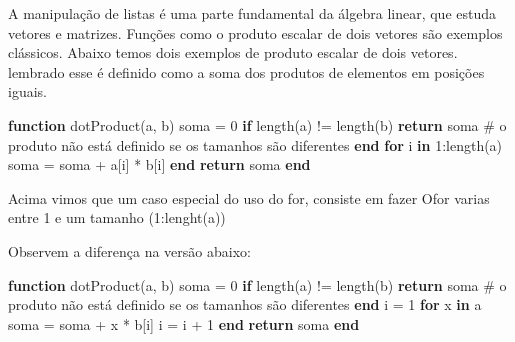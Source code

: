 \documentclass[
  letterpaper,
  DIV=11,
  numbers=noendperiod]{scrreprt}
\newenvironment{Shaded}{\begin{snugshade}}{\end{snugshade}}
\newcommand{\CommentTok}[1]{\textcolor[rgb]{0.37,0.37,0.37}{#1}}
\newcommand{\ControlFlowTok}[1]{\textcolor[rgb]{0.00,0.23,0.31}{\textbf{#1}}}
\newcommand{\FloatTok}[1]{\textcolor[rgb]{0.68,0.00,0.00}{#1}}
\newcommand{\FunctionTok}[1]{\textcolor[rgb]{0.28,0.35,0.67}{#1}}
\newcommand{\KeywordTok}[1]{\textcolor[rgb]{0.00,0.23,0.31}{\textbf{#1}}}
\newcommand{\NormalTok}[1]{\textcolor[rgb]{0.00,0.23,0.31}{#1}}
\newcommand{\OperatorTok}[1]{\textcolor[rgb]{0.37,0.37,0.37}{#1}}
\begin{document}
A manipulação de listas é uma parte fundamental da álgebra linear, que
estuda vetores e matrizes. Funções como o produto escalar de dois
vetores são exemplos clássicos. Abaixo temos dois exemplos de produto
escalar de dois vetores. lembrado esse é definido como a soma dos
produtos de elementos em posições iguais.

\begin{Shaded}
\begin{Highlighting}[]
\KeywordTok{function} \FunctionTok{dotProduct}\NormalTok{(a, b)}
\NormalTok{    soma }\OperatorTok{=} \FloatTok{0}
    \ControlFlowTok{if} \FunctionTok{length}\NormalTok{(a) }\OperatorTok{!=} \FunctionTok{length}\NormalTok{(b)}
       \ControlFlowTok{return}\NormalTok{ soma   }\CommentTok{\# o produto não está definido se os tamanhos são diferentes}
    \ControlFlowTok{end}
    \ControlFlowTok{for}\NormalTok{ i }\KeywordTok{in} \FloatTok{1}\OperatorTok{:}\FunctionTok{length}\NormalTok{(a)}
\NormalTok{        soma }\OperatorTok{=}\NormalTok{ soma }\OperatorTok{+}\NormalTok{ a[i] }\OperatorTok{*}\NormalTok{ b[i]}
    \ControlFlowTok{end}
    \ControlFlowTok{return}\NormalTok{ soma}
\KeywordTok{end}
\end{Highlighting}
\end{Shaded}

Acima vimos que um caso especial do uso do for, consiste em fazer Ofor
varias entre 1 e um tamanho (1:lenght(a))

Observem a diferença na versão abaixo:

\begin{Shaded}
\begin{Highlighting}[]
\KeywordTok{function} \FunctionTok{dotProduct}\NormalTok{(a, b)}
\NormalTok{    soma }\OperatorTok{=} \FloatTok{0}
    \ControlFlowTok{if} \FunctionTok{length}\NormalTok{(a) }\OperatorTok{!=} \FunctionTok{length}\NormalTok{(b)}
       \ControlFlowTok{return}\NormalTok{ soma   }\CommentTok{\# o produto não está definido se os tamanhos são diferentes}
    \ControlFlowTok{end}   
\NormalTok{    i }\OperatorTok{=} \FloatTok{1}
    \ControlFlowTok{for}\NormalTok{ x }\KeywordTok{in}\NormalTok{ a}
\NormalTok{        soma }\OperatorTok{=}\NormalTok{ soma }\OperatorTok{+}\NormalTok{ x }\OperatorTok{*}\NormalTok{ b[i]}
\NormalTok{        i }\OperatorTok{=}\NormalTok{ i }\OperatorTok{+} \FloatTok{1}
    \ControlFlowTok{end} 
    \ControlFlowTok{return}\NormalTok{ soma}
\KeywordTok{end}
\end{Highlighting}
\end{Shaded}
\end{document}
